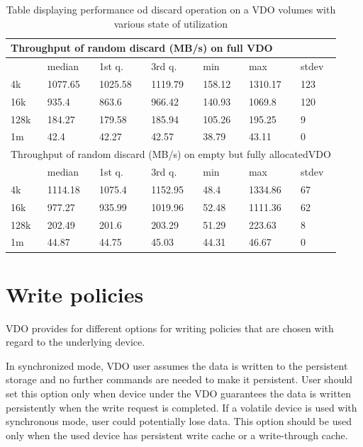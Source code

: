 \documentclass[
  color, %
  table, %
  lof,   %
  lot,   %
]{fithesis3}
\begin{document}
\begin{table}
\centering
\begin{tabular}{|l|l|l|l|l|l|l|}
        \hline
        \multicolumn{7}{|l|}{Throughput of random discard (MB/s) on full VDO} \\ \hline
         & median & 1st q. & 3rd q. & min & max & stdev \\ \hline 
4k & 1077.65 & 1025.58 & 1119.79 & 158.12 & 1310.17 & 123 \\ \hline
16k & 935.4 & 863.6 & 966.42 & 140.93 & 1069.8 & 120 \\ \hline
128k & 184.27 & 179.58 & 185.94 & 105.26 & 195.25 & 9 \\ \hline
1m & 42.4 & 42.27 & 42.57 & 38.79 & 43.11 & 0 \\ \hline
\hline
        \multicolumn{7}{|l|}{Throughput of random discard (MB/s) on empty but fully allocatedVDO} \\ \hline
        & median & 1st q. & 3rd q. & min & max & stdev \\ \hline 
4k & 1114.18 & 1075.4 & 1152.95 & 48.4 & 1334.86 & 67 \\ \hline
16k & 977.27 & 935.99 & 1019.96 & 52.48 & 1111.36 & 62 \\ \hline
128k & 202.49 & 201.6 & 203.29 & 51.29 & 223.63 & 8 \\ \hline
1m & 44.87 & 44.75 & 45.03 & 44.31 & 46.67 & 0 \\ \hline
\end{tabular}
\caption{Table displaying performance od discard operation on a VDO volumes with various state of utilization}
\end{table}

\clearpage

\section{Write policies}
VDO provides for different options for writing policies that are chosen with regard to the underlying device. 

In synchronized mode, VDO user assumes the data is written to the persistent storage and no further commands are needed to make it persistent. User should set this option only when device under the VDO guarantees the data is written persistently when the write request is completed. If a volatile device is used with synchronous mode, user could potentially lose data. This option should be used only when the used device has persistent write cache or a write-through cache.
\end{document}
